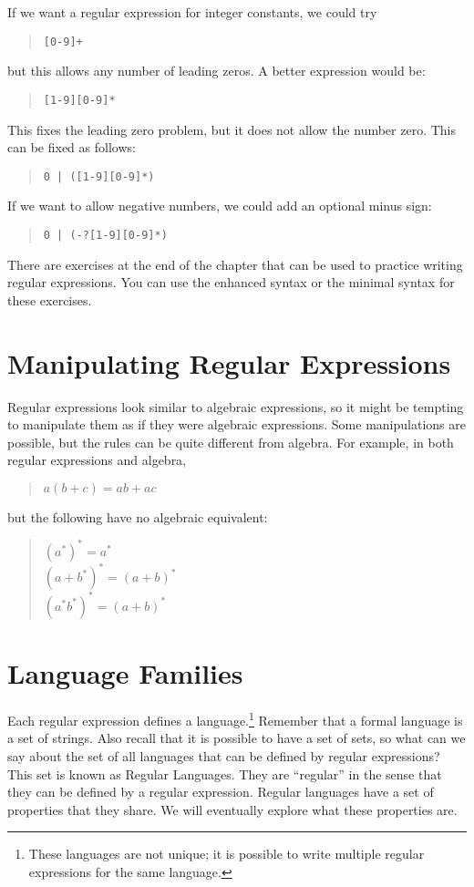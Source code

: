 \documentclass[letterpaper,12pt,openany,reqno]{book}%
\newcommand{\code}[1] {\lstinline[breaklines=yes,breakatwhitespace=yes]{#1}}
\begin{document}
If we want a regular expression for integer constants, we could try
\begin{quote}\code{[0-9]+}\end{quote}
but this allows any number of leading zeros. A better expression would be:
\begin{quote}\code{[1-9][0-9]*}\end{quote}
This fixes the leading zero problem, but it does not allow the number zero. This can be fixed as follows:
\begin{quote}\code{0 | ([1-9][0-9]*)}\end{quote}
If we want to allow negative numbers, we could add an optional minus sign:
\begin{quote}\code{0 | (-?[1-9][0-9]*)}\end{quote}

There are exercises at the end of the chapter that can be used to practice writing regular expressions. You can use the enhanced syntax or the minimal syntax for these exercises.

\section{Manipulating Regular Expressions}

Regular expressions look similar to algebraic expressions, so it might be tempting to manipulate them as if they were algebraic expressions. Some manipulations are possible, but the rules can be quite different from algebra. For example, in both regular expressions and algebra,
\begin{quote}
$a(b+c) = ab + ac$
\end{quote}
but the following have no algebraic equivalent:
\begin{quote}
$(a^*)^* = a^*$\\
$(a+b^*)^* = (a+b)^*$\\
$(a^*b^*)^* = (a+b)^*$
\end{quote}

\section{Language Families}
Each regular expression defines a language.\footnote{These languages are not unique; it is possible to write multiple regular expressions for the same language.} Remember that a formal language is a set of strings. Also recall that it is possible to have a set of sets, so what can we say about the set of all languages that can be defined by regular expressions? This set is known as Regular Languages. They are ``regular'' in the sense that they can be defined by a regular expression. Regular languages have a set of properties that they share. We will eventually explore what these properties are. 
\end{document}
